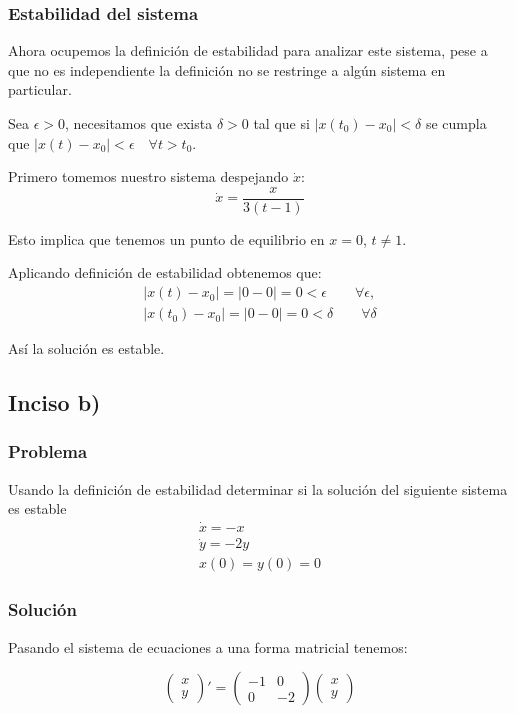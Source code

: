 \documentclass[10pt,letterpaper,titlepage]{article}
\begin{document}
\subsubsection{Estabilidad del sistema}

Ahora ocupemos la definición de estabilidad para analizar este sistema, pese a que no es independiente la definición no se restringe a algún sistema en particular.

Sea $\epsilon>0$, necesitamos que exista $\delta>0$ tal que si $|x(t_0)-x_0|<\delta$ se cumpla que $|x(t)-x_0|<\epsilon\quad\forall t>t_0$.

Primero tomemos nuestro sistema despejando $\dot{x}$:
\[
	\dot{x} = \frac{x}{3(t-1)}
\]

Esto implica que tenemos un punto de equilibrio en $x=0$, $t \ne 1$.

Aplicando definición de estabilidad obtenemos que:
\[
	\begin{array}{c}
		|x(t)-x_0| = |0-0| = 0 < \epsilon \qquad \forall \epsilon,\\
		|x(t_0)-x_0| = |0-0| = 0 < \delta \qquad \forall \delta
	\end{array}
\]

Así la solución es estable.

\subsection{Inciso b)}

\subsubsection{Problema}
Usando la definición de estabilidad determinar si la solución del siguiente sistema es estable
\[
	\begin{array}{c}
		\dot{x} = -x\\
		\dot{y} = -2y\\
		x(0) = y(0) = 0
	\end{array}
\]

\subsubsection{Solución}

Pasando el sistema de ecuaciones a una forma matricial tenemos:

\[
	\left(\begin{matrix}
		x\\
		y
	\end{matrix}\right)' =
	\left(\begin{matrix}
		-1 & 0 \\
		0 & -2
	\end{matrix}\right)
	\left(\begin{matrix}
		x \\
		y
	\end{matrix}\right)
\]
\end{document}
